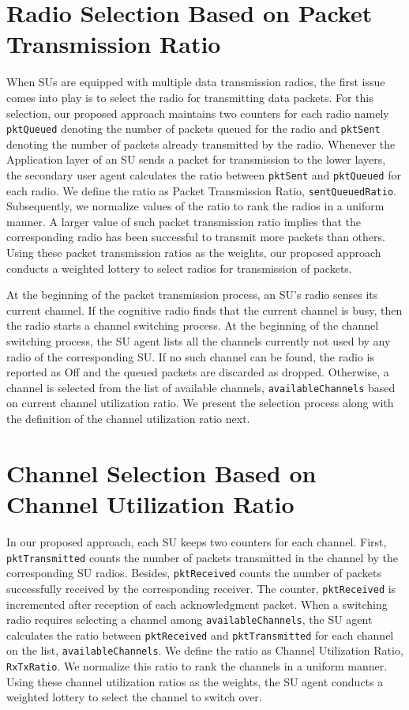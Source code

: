 \section{Radio Selection Based on Packet Transmission Ratio}
\label{sec:radioSelect}

When SUs are equipped with multiple data transmission radios, the first issue comes into play is to select the radio for transmitting data packets. For this selection, our proposed approach maintains two counters for each radio namely \texttt{pktQueued} denoting the number of packets queued for the radio and \texttt{pktSent} denoting the number of packets already transmitted by the radio. Whenever the Application layer of an SU sends a packet for transmission to the lower layers, the secondary user agent calculates the ratio between 	\texttt{pktSent} and \texttt{pktQueued} for each radio. We define the ratio as Packet Transmission Ratio, \texttt{sentQueuedRatio}. Subsequently, we normalize values of the ratio to rank the radios in a uniform manner. A larger value of such packet transmission ratio implies that the corresponding radio has been successful to transmit more packets than others. Using these packet transmission ratios as the weights, our proposed approach conducts a weighted lottery to select radios for transmission of packets.

At the beginning of the packet transmission process, an SU's radio senses its current channel. If the cognitive radio finds that the current channel is busy, then the radio starts a channel switching process. At the beginning of the channel switching process, the SU agent lists all the channels currently not used by any radio of the corresponding SU. If no such channel can be found, the radio is reported as Off and the queued packets are discarded as dropped. Otherwise, a channel is selected from the list of available channels, \texttt{availableChannels} based on current channel utilization ratio. We present the selection process along with the definition of the channel utilization ratio next.

\section{Channel Selection Based on Channel Utilization Ratio}
\label{sec:channelSelect}

In our proposed approach, each SU keeps two counters for each channel. First, \texttt{pktTransmitted} counts the number of packets transmitted in the channel by the corresponding SU radios. Besides, \texttt{pktReceived} counts the number of packets successfully received by the corresponding receiver. The counter, \texttt{pktReceived} is incremented after reception of each acknowledgment packet. When a switching radio requires selecting a channel among \texttt{availableChannels}, the SU agent calculates the ratio between \texttt{pktReceived} and \texttt{pktTransmitted} for each channel on the list, \texttt{availableChannels}. We define the ratio as Channel Utilization Ratio, \texttt{RxTxRatio}. We normalize this ratio to rank the channels in a uniform manner. Using these channel utilization ratios as the weights, the SU agent conducts a weighted lottery to select the channel to switch over.

